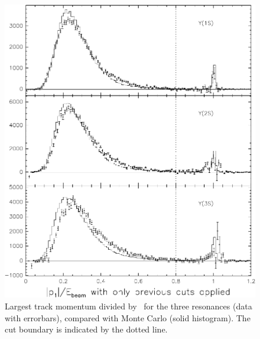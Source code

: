\begin{figure}
  \includegraphics[width=\linewidth]{plots/efficiency_p1}
  \caption{\label{efficiency_p1} Largest track momentum divided by
    \ebeam\ for the three resonances (data with errorbars), compared
    with Monte Carlo (solid histogram).  The cut boundary is indicated
    by the dotted line.}
\end{figure}

